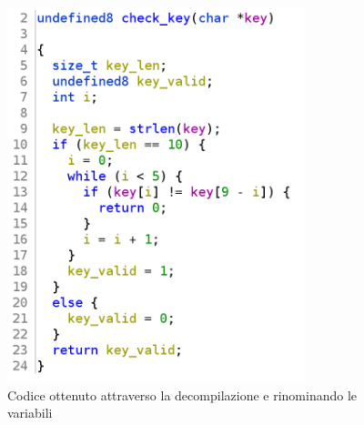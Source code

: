 \begin{figure}[ht]
    \centering
    \includegraphics[width=0.5\linewidth]{images/static-ghidra2.png}
    \caption{Codice ottenuto attraverso la decompilazione e rinominando le variabili}
    \label{fig:ex-ghidra2}
\end{figure}






















